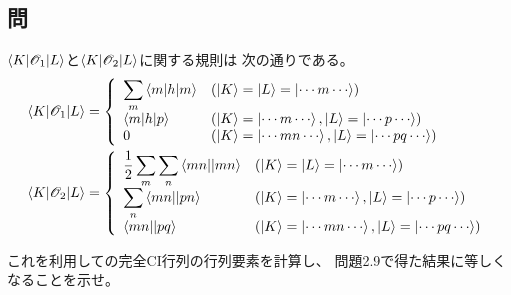 \subsection{問}
$\braket{K|\mathscr{O}_1|L}$と$\braket{K|\mathscr{O}_2|L}$に関する規則は
次の通りである。
\begin{align}
	\braket{K|\mathscr{O}_1|L}
&=
	\left\{
	\begin{array}{>{\displaystyle}ll}
		\sum_m \braket{m|h|m} &
		(\ket{K}=\ket{L}=\ket{\cdots m\cdots}) \\
		\braket{m|h|p} &
		(\ket{K}=\ket{\cdots m\cdots}, \ket{L}=\ket{\cdots p\cdots}) \\
		0 &
		(\ket{K}=\ket{\cdots mn\cdots}, \ket{L}=\ket{\cdots pq\cdots})
	\end{array}
	\right. \\
%
%
	\braket{K|\mathscr{O}_2|L}
&=
	\left\{
	\begin{array}{>{\displaystyle}ll}
		\frac{1}{2} \sum_m \sum_n \antitwo{mn}{mn} &
		(\ket{K}=\ket{L}=\ket{\cdots m\cdots}) \\
		\sum_n \antitwo{mn}{pn} &
		(\ket{K}=\ket{\cdots m\cdots}, \ket{L}=\ket{\cdots p\cdots}) \\
		\antitwo{mn}{pq} &
		(\ket{K}=\ket{\cdots mn\cdots}, \ket{L}=\ket{\cdots pq\cdots})
	\end{array}
	\right.
\end{align}

これを利用しての完全CI行列の行列要素を計算し、
問題2.9で得た結果に等しくなることを示せ。


